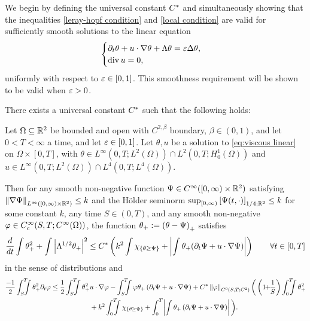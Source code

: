 We begin by defining the universal constant $C^\ast$ and simultaneously showing that the inequalities \eqref{leray-hopf condition} and \eqref{local condition} are valid for sufficiently smooth solutions to the linear equation
\begin{equation} \label{eq:viscous linear}
\begin{cases}
\partial_t \theta + u \cdot \nabla \theta + \Lambda \theta = \varepsilon \Delta \theta, \\
\operatorname{div} u = 0,
\end{cases}
\end{equation}
uniformly with respect to $\varepsilon \in [0,1]$.  This smoothness requirement will be shown to be valid when $\varepsilon > 0$.  

\begin{proposition} \label{thm:suitability}
There exists a universal constant $C^\ast$ such that the following holds:

Let $\Omega \subseteq \mathbb{R}^2$ be bounded and open with $C^{2,\beta}$ boundary, $\beta \in (0,1)$, and let $0 < T < \infty$ a time, and let $\varepsilon \in [0,1]$.  Let $\theta, u$ be a solution to \eqref{eq:viscous linear} on $\Omega \times [0,T]$, with $\theta \in L^\infty(0,T; L^2(\Omega)) \cap L^2(0,T; H_0^1(\Omega))$ and $u \in L^\infty(0,T; L^2(\Omega)) \cap L^4(0,T; L^4(\Omega))$.  

Then for any smooth non-negative function $\Psi \in C^\infty([0,\infty)\times \mathbb{R}^2)$ satisfying $\left\lVert\nabla\Psi\right\rVert_{L^\infty([0,\infty)\times\mathbb{R}^2)} \leq k$ and the H\"{o}lder seminorm $\sup_{[0,\infty)} \left[ \Psi(t,\cdot) \right]_{1/4; \mathbb{R}^2} \leq k$ for some constant $k$, any time $S \in (0,T)$, and any smooth non-negative $\varphi \in C_c^\infty(S,T;C^\infty(\Omega))$, the function $\theta_+ := \left( \theta - \Psi \right)_+$ satisfies
\begin{equation}\label{leray-hopf condition}
\frac{d}{dt} \int \theta_+^2 + \int \left\lvert \Lambda^{1/2} \theta_+ \right\rvert^2 \leq C^\ast \left(  k^2 \int \chi_{\{\theta \geq \Psi\}} + \left\lvert \int \theta_+ (\partial_t \Psi + u\cdot\nabla\Psi) \right\rvert  \right) \qquad \forall t \in [0,T]
\end{equation}
in the sense of distributions and
\begin{equation} \label{local condition} 
\begin{aligned} 
\frac{-1}{2} \int_S^T\!\!\!\!\int \theta_+^2 \del_t \varphi &\leq \frac{1}{2} \int_S^T\!\!\!\!\int  \theta_+^2 u \cdot \grad \varphi - \int_S^T\!\!\!\!\int \varphi \theta_+ \paren{\del_t \Psi + u \cdot \grad \Psi} 
+ \Csuit \norm{\varphi}_{C^0(S,T;C^2)} \bigg( \paren{1\!\!+\!\!\frac{1}{S}} \int_0^T\!\!\!\!\int \theta_+^2 
\\ & \hskip2cm + k^2 \int_0^T\!\!\!\!\int \indic{\theta\geq\Psi} + \int_0^T\! \abs{\int \theta_+ \paren{\del_t \Psi + u\cdot\grad\Psi}} \bigg).
\end{aligned}
\end{equation}
\end{proposition}

